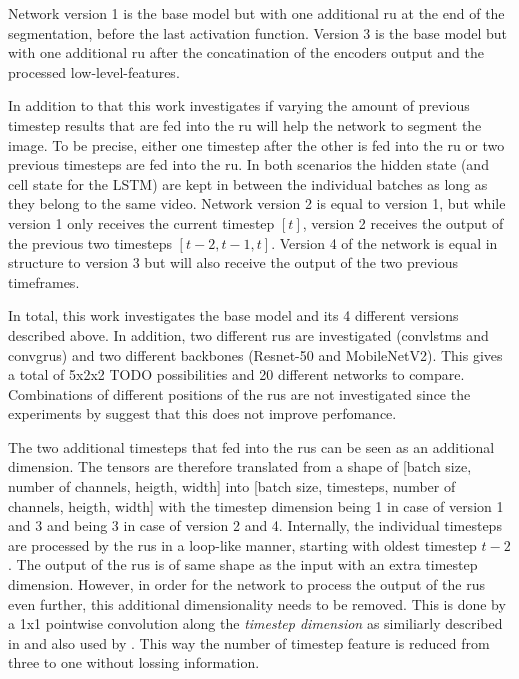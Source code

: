\documentclass[11pt,
  paper=a4, 
  bibliography=totocnumbered,
	captions=tableheading,
	BCOR=10mm
]{scrreprt}
\theoremstyle{definition}
\begin{document}
Network version 1 is the base model but with one additional \gls{ru} at the end of the segmentation, before the last activation function.
Version 3 is the base model but with one additional \gls{ru} after the concatination of the encoders output and the processed low-level-features.

In addition to that this work investigates if varying the amount of previous timestep results that are fed into the \gls{ru} will help the network to segment the image.
To be precise, either one timestep after the other is fed into the \gls{ru} or two previous timesteps are fed into the \gls{ru}.
In both scenarios the hidden state (and cell state for the LSTM) are kept in between the individual batches as long as they belong to the same video.
Network version 2 is equal to version 1, but while version 1 only receives the current timestep $[t]$, version 2 receives the output of the previous two timesteps $[t-2,t-1,t]$.
Version 4 of the network is equal in structure to version 3 but will also receive the output of the two previous timeframes.

In total, this work investigates the base model and its 4 different versions described above.
In addition, two different \glspl{ru} are investigated (\glspl{convlstm} and \glspl{convgru}) and two different backbones (Resnet-50 and MobileNetV2).
This gives a total of 5x2x2 TODO possibilities and 20 different networks to compare.
Combinations of different positions of the \glspl{ru} are not investigated since the experiments by \textcite{Pfeuffer2019} suggest that this does not improve perfomance.

The two additional timesteps that fed into the \glspl{ru} can be seen as an additional dimension.
The tensors are therefore translated from a shape of [batch size, number of channels, heigth, width] into [batch size, timesteps, number of channels, heigth, width] with the timestep dimension being 1 in case of version 1 and 3 and being 3 in case of version 2 and 4.
Internally, the individual timesteps are processed by the \glspl{ru} in a loop-like manner, starting with oldest timestep $t-2$.
The output of the \glspl{ru} is of same shape as the input with an extra timestep dimension.
However, in order for the network to process the output of the \glspl{ru} even further, this additional dimensionality needs to be removed.
This is done by a 1x1 pointwise convolution along the \textit{timestep dimension} as similiarly described in \cite{Sandler2018} and also used by \cite{Chen2018b}.
This way the number of timestep feature is reduced from three to one without lossing information.
\end{document}
